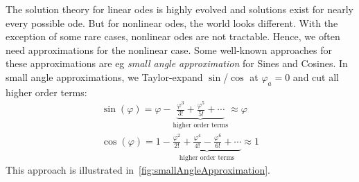 	The solution theory for linear \acp{ode} is highly evolved and solutions exist for nearly every possible \ac{ode}. But for nonlinear \acp{ode}, the world looks different. With the exception of some rare cases, nonlinear \acp{ode} are not tractable. Hence, we often need approximations for the nonlinear case. Some well-known approaches for these approximations are \ac{eg} \emph{small angle approximation} for Sines and Cosines. In small angle approximations, we Taylor-expand \( \sin \)/\( \cos \) at \( \varphi_a = 0 \) and cut all higher order terms:
	\begin{gather*}
		\sin(\varphi) = \varphi - \underbrace{\frac{\varphi^3}{3!} + \frac{\varphi^5}{5!} + \cdots}_\text{higher order terms} \approx \varphi \\
		\cos(\varphi) = 1 - \underbrace{\frac{\varphi^2}{2!} + \frac{\varphi^4}{4!} - \frac{\varphi^6}{6!} + \cdots}_\text{higher order terms} \approx 1
	\end{gather*}
	This approach is illustrated in~\autoref{fig:smallAngleApproximation}.

